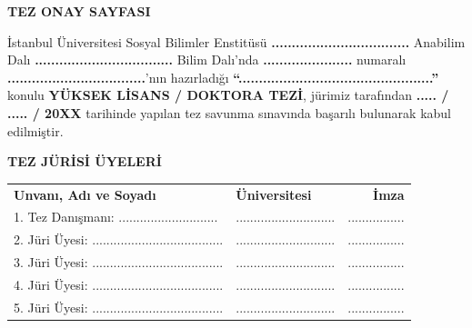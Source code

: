 \thispagestyle{empty}
\begin{center}
    \bfseries
    \fontsize{14pt}{18pt}\selectfont
    TEZ ONAY SAYFASI
\end{center}

\vspace{1.5cm}

\noindent
İstanbul Üniversitesi Sosyal Bilimler Enstitüsü \textbf{..................................} Anabilim Dalı \textbf{..................................} Bilim Dalı'nda \textbf{......................} numaralı \textbf{..................................}'nın hazırladığı \textbf{“................................................”} konulu \textbf{YÜKSEK LİSANS / DOKTORA TEZİ}, jürimiz tarafından \textbf{..... / ..... / 20XX} tarihinde yapılan tez savunma sınavında başarılı bulunarak kabul edilmiştir.

\vspace{2.5cm}

\begin{center}
\textbf{TEZ JÜRİSİ ÜYELERİ}
\end{center}

\vspace{1.5cm}

\noindent
\begin{tabular*}{\textwidth}{@{\extracolsep{\fill}}llr}
    \textbf{Unvanı, Adı ve Soyadı} & \textbf{Üniversitesi} & \textbf{İmza} \\[1.3cm]
    1. Tez Danışmanı: ............................ & ............................ & ................ \\[1.3cm]
    2. Jüri Üyesi: ..................................... & ............................ & ................ \\[1.3cm]
    3. Jüri Üyesi: ..................................... & ............................ & ................ \\[1.3cm]
    4. Jüri Üyesi: ..................................... & ............................ & ................ \\[1.3cm]
    5. Jüri Üyesi: ..................................... & ............................ & ................ \\
\end{tabular*}

\clearpage
